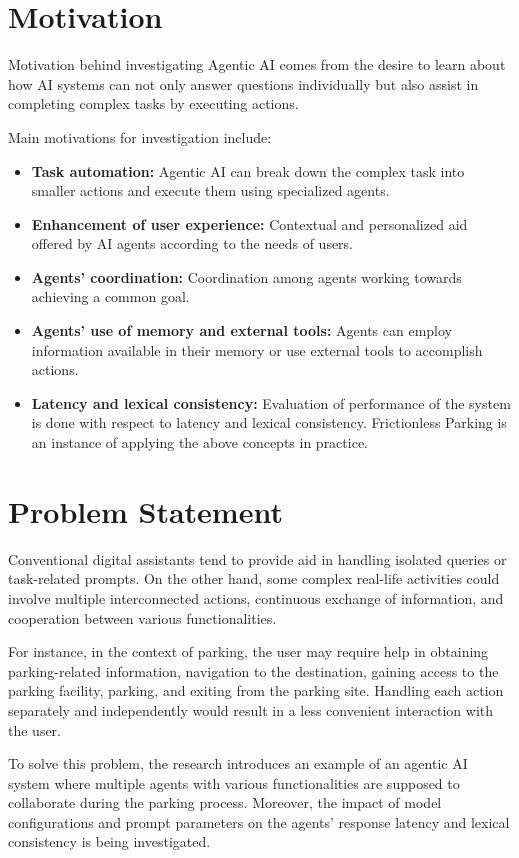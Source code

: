 \documentclass[12pt,a4paper]{report}
\begin{document}
\section{Motivation}
Motivation behind investigating Agentic AI comes from the desire to learn about how AI systems can not only answer questions individually but also assist in completing complex tasks by executing actions.

Main motivations for investigation include:
\begin{itemize}[leftmargin=*]
  \item \textbf{Task automation:} Agentic AI can break down the complex task into smaller actions and execute them using specialized agents.
  \item \textbf{Enhancement of user experience:} Contextual and personalized aid offered by AI agents according to the needs of users.
  \item \textbf{Agents' coordination:} Coordination among agents working towards achieving a common goal.
  \item \textbf{Agents' use of memory and external tools:} Agents can employ information available in their memory or use external tools to accomplish actions.
  \item \textbf{Latency and lexical consistency:} Evaluation of performance of the system is done with respect to latency and lexical consistency. Frictionless Parking is an instance of applying the above concepts in practice.
\end{itemize}

\section{Problem Statement}
Conventional digital assistants tend to provide aid in handling isolated queries or task-related prompts. On the other hand, some complex real-life activities could involve multiple interconnected actions, continuous exchange of information, and cooperation between various functionalities.

For instance, in the context of parking, the user may require help in obtaining parking-related information, navigation to the destination, gaining access to the parking facility, parking, and exiting from the parking site. Handling each action separately and independently would result in a less convenient interaction with the user.

To solve this problem, the research introduces an example of an agentic AI system where multiple agents with various functionalities are supposed to collaborate during the parking process. Moreover, the impact of model configurations and prompt parameters on the agents' response latency and lexical consistency is being investigated.
\end{document}
